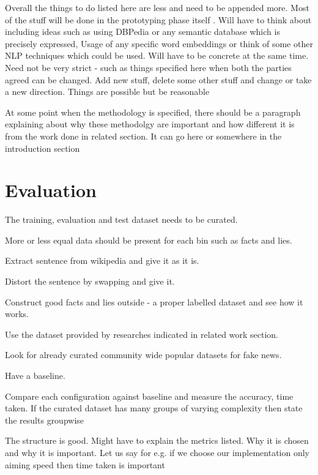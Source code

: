\documentclass[a4paper, 11pt]{article}
\begin{document}
\color{red}
Overall the things to do listed here are less and need to be appended more. Most of the stuff will be done in the prototyping phase itself . Will have to think about including ideas such as using DBPedia or any semantic database which is precisely expressed, Usage of any specific word embeddings or think of some other NLP techniques which could be used. Will have to be concrete at the same time. Need not be very strict - such as things specified here when both the parties agreed can be changed. Add new stuff, delete some other stuff and change or take a new direction. Things are possible but be reasonable

At some point when the methodology is specified, there should be a paragraph explaining about why these methodolgy are important and how different it is from the work done in related section. It can go here or somewhere in the introduction section
\color{black}

\section{Evaluation}

The training, evaluation and test dataset needs to be curated. 

More or less equal data should be present for each bin such as facts and lies.

Extract sentence from wikipedia and give it as it is.

Distort the sentence by swapping and give it.

Construct good facts and lies outside - a proper labelled dataset and see how it works.

Use the dataset provided by researches indicated in related work section.

Look for already curated community wide popular datasets for fake news.

Have a baseline.

Compare each configuration against baseline and measure the accuracy, time taken. If the curated dataset has many groups of varying complexity then state the results groupwise


\color{red}
The structure is good. Might have to explain the metrics listed. Why it is chosen and why it is important. Let us say for e.g. if we choose our implementation only aiming speed then time taken is important
\color{black}

\newpage
\end{document}
